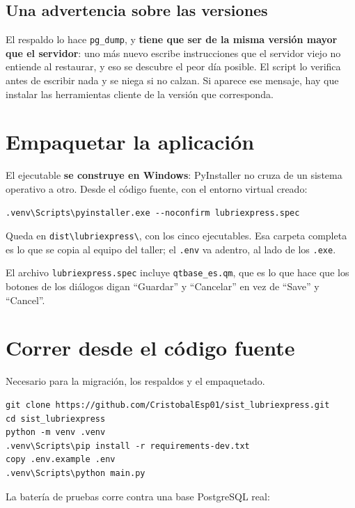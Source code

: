 \documentclass[11pt,a4paper]{article}
\begin{document}
\subsection{Una advertencia sobre las versiones}

El respaldo lo hace \texttt{pg\_dump}, y \textbf{tiene que ser de la misma
versión mayor que el servidor}: uno más nuevo escribe instrucciones que el
servidor viejo no entiende al restaurar, y eso se descubre el peor día posible.
El script lo verifica antes de escribir nada y se niega si no calzan. Si aparece
ese mensaje, hay que instalar las herramientas cliente de la versión que
corresponda.

\section{Empaquetar la aplicación}
\label{sec:empaquetar}

El ejecutable \textbf{se construye en Windows}: PyInstaller no cruza de un
sistema operativo a otro. Desde el código fuente, con el entorno virtual creado:

\begin{lstlisting}
.venv\Scripts\pyinstaller.exe --noconfirm lubriexpress.spec
\end{lstlisting}

Queda en \texttt{dist\textbackslash lubriexpress\textbackslash}, con los cinco
ejecutables. Esa carpeta completa es lo que se copia al equipo del taller; el
\texttt{.env} va adentro, al lado de los \texttt{.exe}.

El archivo \texttt{lubriexpress.spec} incluye \texttt{qtbase\_es.qm}, que es lo
que hace que los botones de los diálogos digan ``Guardar'' y ``Cancelar'' en vez
de ``Save'' y ``Cancel''.

\section{Correr desde el código fuente}

Necesario para la migración, los respaldos y el empaquetado.

\begin{lstlisting}
git clone https://github.com/CristobalEsp01/sist_lubriexpress.git
cd sist_lubriexpress
python -m venv .venv
.venv\Scripts\pip install -r requirements-dev.txt
copy .env.example .env
.venv\Scripts\python main.py
\end{lstlisting}

La batería de pruebas corre contra una base PostgreSQL real:
\end{document}
